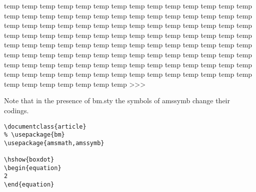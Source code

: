 {{{{{{\:temp \vartriangle
\:temp \eqcirc
\:temp \lesseqgtr
\:temp \gtreqless
\:temp \lesseqqgtr
\:temp \gtreqqless
\:temp \Rrightarrow
\:temp \Lleftarrow
\:temp \varpropto
\:temp \smallsmile
\:temp \smallfrown
\:temp \Subset
\:temp \Supset
\:temp \subseteqq
\:temp \supseteqq
\:temp \bumpeq
\:temp \Bumpeq
\:temp \lll
\:temp \ggg
\:temp \pitchfork
\:temp \backsim
\:temp \backsimeq
\:temp \lvertneqq
\:temp \gvertneqq
\:temp \nleq
\:temp \ngeq
\:temp \nless
\:temp \ngtr
\:temp \nprec
\:temp \nsucc
\:temp \lneqq
\:temp \gneqq
\:temp \nleqslant
\:temp \ngeqslant
{}
\:temp \gneq
\:temp \npreceq
\:temp \nsucceq
\:temp \precnsim
\:temp \succnsim
\:temp \lnsim
\:temp \gnsim
\:temp \nleqq
\:temp \ngeqq
\:temp \precneqq
\:temp \succneqq
\:temp \precnapprox
\:temp \succnapprox
\:temp \lnapprox
\:temp \gnapprox
\:temp \nsim
\:temp \ncong
\:temp \varsubsetneq
\:temp \varsupsetneq
\:temp \nsubseteqq
\:temp \nsupseteqq
\:temp \subsetneqq
\:temp \supsetneqq
\:temp \varsubsetneqq
\:temp \varsupsetneqq
\:temp \subsetneq
\:temp \supsetneq
\:temp \nsubseteq
\:temp \nsupseteq
\:temp \nparallel
\:temp \nmid
\:temp \nshortmid
\:temp \nshortparallel
\:temp \nvdash
\:temp \nVdash
\:temp \nvDash
\:temp \nVDash
\:temp \ntrianglerighteq
\:temp \ntrianglelefteq
\:temp \ntriangleleft
\:temp \ntriangleright
\:temp \nleftarrow
\:temp \nrightarrow
\:temp \nLeftarrow
\:temp \nRightarrow
\:temp \nLeftrightarrow
\:temp \nleftrightarrow
\:temp \eqsim
\:temp \shortmid
\:temp \shortparallel
\:temp \thicksim
\:temp \thickapprox
\:temp \approxeq
\:temp \succapprox
\:temp \precapprox
\:temp \curvearrowleft
\:temp \curvearrowright
\:temp \backepsilon
\:temp \square
\:temp \blacksquare
\:temp \lozenge
\:temp \blacklozenge
\:temp \backprime
\:temp \bigstar
\:temp \blacktriangledown
\:temp \blacktriangle
\:temp \triangledown
\:temp \measuredangle
\:temp \sphericalangle
\:temp \circledS
\:temp \complement
\:temp \diagup
\:temp \diagdown
\:temp \varnothing
\:temp \nexists
\:temp \Finv
\:temp \Game
\:temp \eth
\:temp \beth
\:temp \gimel
\:temp \daleth
\:temp \digamma
\:temp \varkappa
\:temp \Bbbk
\:temp \hslash
>>>

Note that in the presence of bm.sty the symbols of amssymb change their
codings.

\begin{verbatim}
\documentclass{article}  
% \usepackage{bm}  
\usepackage{amsmath,amssymb}  
  
\hshow{boxdot} 
\begin{equation}  
2 
\end{equation}  
 

\end{verbatim}}}}}}}
